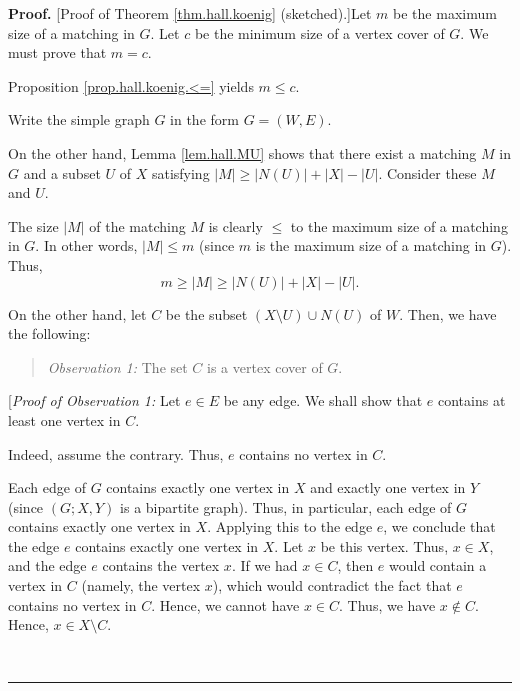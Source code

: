 \documentclass[numbers=enddot,12pt,final,onecolumn,notitlepage]{scrartcl}%
\theoremstyle{definition}
\newenvironment{statement}{\begin{quote}}{\end{quote}}
\newenvironment{proof}[1][Proof]{\noindent\textbf{#1.} }{\ \rule{0.5em}{0.5em}}
\begin{document}
\begin{proof}
[Proof of Theorem \ref{thm.hall.koenig} (sketched).]Let $m$ be the maximum
size of a matching in $G$. Let $c$ be the minimum size of a vertex cover of
$G$. We must prove that $m=c$.

Proposition \ref{prop.hall.koenig.<=} yields $m\leq c$.

Write the simple graph $G$ in the form $G=\left(  W,E\right)  $.

On the other hand, Lemma \ref{lem.hall.MU} shows that there exist a matching
$M$ in $G$ and a subset $U$ of $X$ satisfying $\left\vert M\right\vert
\geq\left\vert N\left(  U\right)  \right\vert +\left\vert X\right\vert
-\left\vert U\right\vert $. Consider these $M$ and $U$.

The size $\left\vert M\right\vert $ of the matching $M$ is clearly $\leq$ to
the maximum size of a matching in $G$. In other words, $\left\vert
M\right\vert \leq m$ (since $m$ is the maximum size of a matching in $G$).
Thus,%
\begin{equation}
m\geq\left\vert M\right\vert \geq\left\vert N\left(  U\right)  \right\vert
+\left\vert X\right\vert -\left\vert U\right\vert
.\label{pf.thm.hall.koenig.m>=}%
\end{equation}


On the other hand, let $C$ be the subset $\left(  X\setminus U\right)  \cup
N\left(  U\right)  $ of $W$. Then, we have the following:

\begin{statement}
\textit{Observation 1:} The set $C$ is a vertex cover of $G$.
\end{statement}

[\textit{Proof of Observation 1:} Let $e\in E$ be any edge. We shall show that
$e$ contains at least one vertex in $C$.

Indeed, assume the contrary. Thus, $e$ contains no vertex in $C$.

Each edge of $G$ contains exactly one vertex in $X$ and exactly one vertex in
$Y$ (since $\left(  G;X,Y\right)  $ is a bipartite graph). Thus, in
particular, each edge of $G$ contains exactly one vertex in $X$. Applying this
to the edge $e$, we conclude that the edge $e$ contains exactly one vertex in
$X$. Let $x$ be this vertex. Thus, $x\in X$, and the edge $e$ contains the
vertex $x$. If we had $x\in C$, then $e$ would contain a vertex in $C$
(namely, the vertex $x$), which would contradict the fact that $e$ contains no
vertex in $C$. Hence, we cannot have $x\in C$. Thus, we have $x\notin C$.
Hence, $x\in X\setminus C$.


\end{proof}
\end{document}
